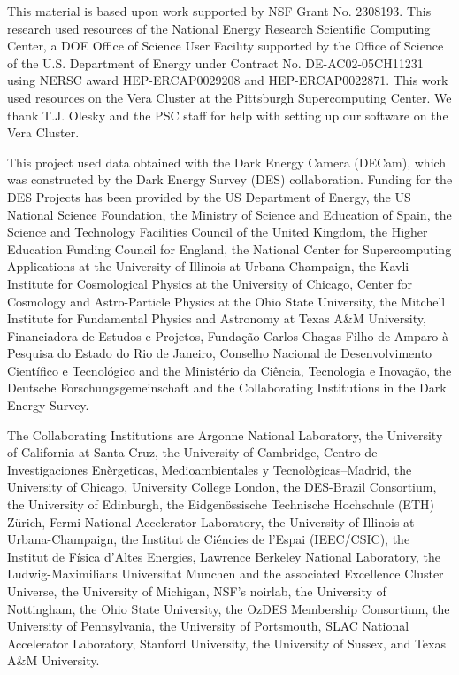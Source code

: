 \documentclass[twocolumn]{aastex631}
\begin{document}
\begin{acknowledgements}

This material is based upon work supported by NSF Grant No. 2308193. This research used resources of the National Energy Research
Scientific Computing Center, a DOE Office of Science User Facility
supported by the Office of Science of the U.S. Department of Energy
under Contract No. DE-AC02-05CH11231 using NERSC award
HEP-ERCAP0029208 and HEP-ERCAP0022871. This work used resources on the Vera Cluster at the Pittsburgh Supercomputing Center. We thank T.J. Olesky and the PSC staff for help with setting up our software on the Vera Cluster.

This project used data obtained with the Dark Energy Camera (DECam), which was constructed by the Dark Energy Survey (DES) collaboration. Funding for the DES Projects has been provided by the US Department of Energy, the US National Science Foundation, the Ministry of Science and Education of Spain, the Science and Technology Facilities Council of the United Kingdom, the Higher Education Funding Council for England, the National Center for Supercomputing Applications at the University of Illinois at Urbana-Champaign, the Kavli Institute for Cosmological Physics at the University of Chicago, Center for Cosmology and Astro-Particle Physics at the Ohio State University, the Mitchell Institute for Fundamental Physics and Astronomy at Texas A\&M University, Financiadora de Estudos e Projetos, Fundação Carlos Chagas Filho de Amparo à Pesquisa do Estado do Rio de Janeiro, Conselho Nacional de Desenvolvimento Científico e Tecnológico and the Ministério da Ciência, Tecnologia e Inovação, the Deutsche Forschungsgemeinschaft and the Collaborating Institutions in the Dark Energy Survey.

The Collaborating Institutions are Argonne National Laboratory, the University of California at Santa Cruz, the University of Cambridge, Centro de Investigaciones En\`ergeticas, Medioambientales y Tecnol\`ogicas–Madrid, the University of Chicago, University College London, the DES-Brazil Consortium, the University of Edinburgh, the Eidgenössische Technische Hochschule (ETH) Zürich, Fermi National Accelerator Laboratory, the University of Illinois at Urbana-Champaign, the Institut de Ci\'encies de l’Espai (IEEC/CSIC), the Institut de F\'isica d’Altes Energies, Lawrence Berkeley National Laboratory, the Ludwig-Maximilians Universit\:at M\:unchen and the associated Excellence Cluster Universe, the University of Michigan, NSF’s \gls{noirlab}, the University of Nottingham, the Ohio State University, the OzDES Membership Consortium, the University of Pennsylvania, the University of Portsmouth, SLAC National Accelerator Laboratory, Stanford University, the University of Sussex, and Texas A\&M University.


\end{acknowledgements}
\end{document}
